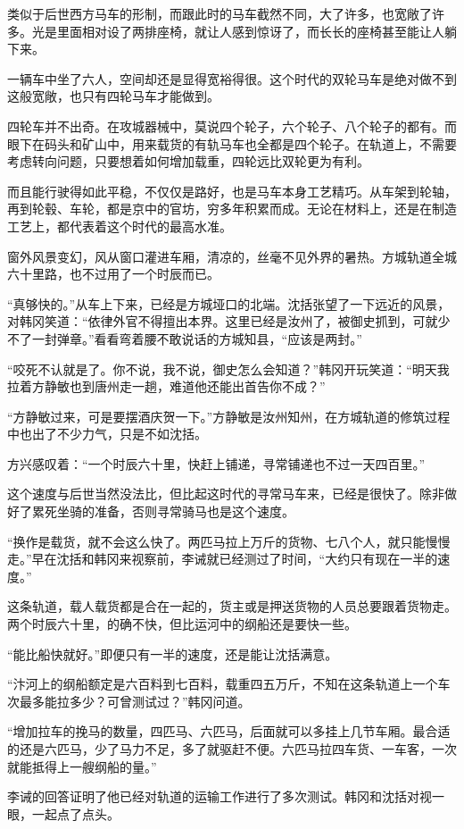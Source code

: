 类似于后世西方马车的形制，而跟此时的马车截然不同，大了许多，也宽敞了许多。光是里面相对设了两排座椅，就让人感到惊讶了，而长长的座椅甚至能让人躺下来。

一辆车中坐了六人，空间却还是显得宽裕得很。这个时代的双轮马车是绝对做不到这般宽敞，也只有四轮马车才能做到。

四轮车并不出奇。在攻城器械中，莫说四个轮子，六个轮子、八个轮子的都有。而眼下在码头和矿山中，用来载货的有轨马车也全都是四个轮子。在轨道上，不需要考虑转向问题，只要想着如何增加载重，四轮远比双轮更为有利。

而且能行驶得如此平稳，不仅仅是路好，也是马车本身工艺精巧。从车架到轮轴，再到轮毂、车轮，都是京中的官坊，穷多年积累而成。无论在材料上，还是在制造工艺上，都代表着这个时代的最高水准。

窗外风景变幻，风从窗口灌进车厢，清凉的，丝毫不见外界的暑热。方城轨道全城六十里路，也不过用了一个时辰而已。

“真够快的。”从车上下来，已经是方城垭口的北端。沈括张望了一下远近的风景，对韩冈笑道：“依律外官不得擅出本界。这里已经是汝州了，被御史抓到，可就少不了一封弹章。”看看弯着腰不敢说话的方城知县，“应该是两封。”

“咬死不认就是了。你不说，我不说，御史怎么会知道？”韩冈开玩笑道：“明天我拉着方静敏也到唐州走一趟，难道他还能出首告你不成？”

“方静敏过来，可是要摆酒庆贺一下。”方静敏是汝州知州，在方城轨道的修筑过程中也出了不少力气，只是不如沈括。

方兴感叹着：“一个时辰六十里，快赶上铺递，寻常铺递也不过一天四百里。”

这个速度与后世当然没法比，但比起这时代的寻常马车来，已经是很快了。除非做好了累死坐骑的准备，否则寻常骑马也是这个速度。

“换作是载货，就不会这么快了。两匹马拉上万斤的货物、七八个人，就只能慢慢走。”早在沈括和韩冈来视察前，李诫就已经测过了时间，“大约只有现在一半的速度。”

这条轨道，载人载货都是合在一起的，货主或是押送货物的人员总要跟着货物走。两个时辰六十里，的确不快，但比运河中的纲船还是要快一些。

“能比船快就好。”即便只有一半的速度，还是能让沈括满意。

“汴河上的纲船额定是六百料到七百料，载重四五万斤，不知在这条轨道上一个车次最多能拉多少？可曾测试过？”韩冈问道。

“增加拉车的挽马的数量，四匹马、六匹马，后面就可以多挂上几节车厢。最合适的还是六匹马，少了马力不足，多了就驱赶不便。六匹马拉四车货、一车客，一次就能抵得上一艘纲船的量。”

李诫的回答证明了他已经对轨道的运输工作进行了多次测试。韩冈和沈括对视一眼，一起点了点头。

